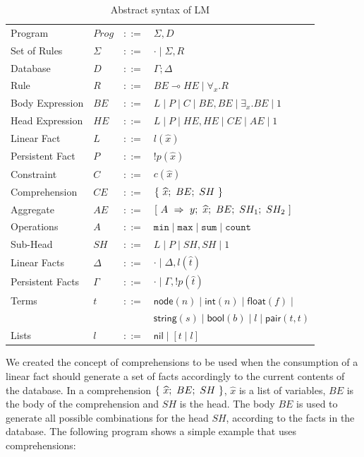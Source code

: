\documentclass{sigplanconf}
\newcommand{\m}[1]{\mathsf{#1}}
\newcommand{\lolli}{\multimap}
\newcommand{\bang}{{!}}
\begin{document}
\begin{table}[ht]
\centering
{\scriptsize
\begin{tabular}{llcl}
Program          & $Prog$ & $::=$ & $\Sigma, D$ \\
Set of Rules     & $\Sigma$ & $::=$ & $\cdot \; | \; \Sigma, R$\\
Database         & $D$ & $::=$ & $\Gamma; \Delta$ \\
Rule             & $R$ & $::=$ & $BE \lolli HE \; | \; \forall_{x}. R$ \\
Body Expression  & $BE$ & $::=$ & $L \; | \; P \; | \; C \; | \; BE, BE \; | \; \exists_{x}. BE \; | \; 1$\\
Head Expression  & $HE$ & $::=$ & $L \; | \; P \; | \; HE, HE \; | \; CE \; | \; AE \; | \; 1$\\
Linear Fact      & $L$ & $::=$ & $l(\hat{x})$\\
Persistent Fact  & $P$ & $::=$ & $\bang p(\hat{x})$\\
Constraint       & $C$ & $::=$ & $c(\hat{x})$ \\
Comprehension    & $CE$ & $::=$ & $\{~\widehat{x};~BE;~SH~\}$ \\
Aggregate        & $AE$ & $::=$ & $[~A~\Rightarrow~y;~\widehat{x};~BE;~SH_1;~SH_2~]$ \\
Operations       & $A$ & $::=$ & $\mathtt{min} \; | \; \mathtt{max} \; | \; \mathtt{sum} \; | \; \mathtt{count}$ \\
Sub-Head         & $SH$ & $::=$ & $L \; | \; P \; | \; SH, SH \; | \; 1$\\
Linear Facts     & $\Delta$ & $::=$ & $\cdot \; | \; \Delta, l(\hat{t})$ \\
Persistent Facts & $\Gamma$ & $::=$ & $\cdot \; | \; \Gamma, \bang p(\hat{t})$ \\
Terms            & $t$ & $::=$ & $\m{node}(n) \; | \; \m{int}(n) \; | \; \m{float}(f) \; | $\\
                 &     &       & $ \m{string}(s) \; | \; \m{bool}(b) \; | \; l \; | \; \m{pair}(t,t)$ \\
Lists            & $l$ & $::=$ & $\m{nil} \; | \; [ t \; | \; l ]$\\
\end{tabular}
}
\caption{Abstract syntax of LM}
\label{tbl:ast}
\end{table}

We created the concept of comprehensions to be used when the
consumption of a linear fact should generate a set of facts
accordingly to the current contents of the database. In a
comprehension $\{~\widehat{x};~BE;~SH~\}$, $\widehat{x}$ is a list of variables,
$BE$ is the body of the comprehension and $SH$ is the head. The body
$BE$ is used to generate all possible combinations for the head $SH$,
according to the facts in the database. The following program shows a
simple example that uses comprehensions:
\end{document}
